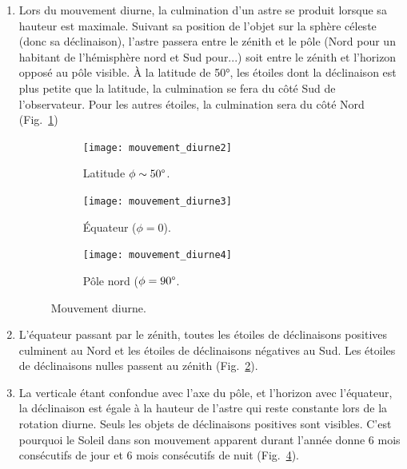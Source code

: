\documentclass[a4paper,10pt]{report}
\renewcommand{\deg}{\ensuremath{\degree}}
\begin{document}
\begin{Answer}
  \begin{enumerate}
  \item Lors du mouvement diurne, la culmination d'un astre se produit
    lorsque sa hauteur est maximale.  Suivant sa position de l'objet
    sur la sphère céleste (donc sa déclinaison), l'astre passera entre
    le zénith et le pôle (Nord pour un habitant de l'hémisphère nord
    et Sud pour...) soit entre le zénith et l'horizon opposé au pôle
    visible. À la latitude de 50°, les étoiles dont la déclinaison est
    plus petite que la latitude, la culmination se fera du côté Sud de
    l'observateur.  Pour les autres étoiles, la culmination sera du
    côté Nord (Fig.~\ref{fig:mouvementdiurne2})

    \begin{figure}
      \centering
      \begin{subfigure}[b]{0.3\textwidth}
        \centering
        \texttt{[image: mouvement\_diurne2]}
        \caption{Latitude $\phi\sim 50\deg$.}
        \label{fig:mouvementdiurne2}
      \end{subfigure}
      \begin{subfigure}[b]{0.3\textwidth}
        \centering
        \texttt{[image: mouvement\_diurne3]}
        \caption{Équateur ($\phi = 0$).}
        \label{fig:mouvementdiurne3}
      \end{subfigure}
      \begin{subfigure}[b]{0.3\textwidth}
        \centering
        \texttt{[image: mouvement\_diurne4]}
        \caption{Pôle nord ($\phi = 90\deg$.}
        \label{fig:mouvementdiurne4}
      \end{subfigure}
      \caption{Mouvement diurne.}
    \end{figure}

  \item L'équateur passant par le zénith, toutes les étoiles de
    déclinaisons positives culminent au Nord et les étoiles de
    déclinaisons négatives au Sud. Les étoiles de déclinaisons nulles
    passent au zénith (Fig.~\ref{fig:mouvementdiurne3}).

  \item La verticale étant confondue avec l'axe du pôle, et l'horizon
    avec l'équateur, la déclinaison est égale à la hauteur de l'astre
    qui reste constante lors de la rotation diurne.  Seuls les objets
    de déclinaisons positives sont visibles. C'est pourquoi le Soleil
    dans son mouvement apparent durant l'année donne 6 mois
    consécutifs de jour et 6 mois consécutifs de nuit
    (Fig.~\ref{fig:mouvementdiurne4}).
  \end{enumerate}
\end{Answer}
\end{document}
